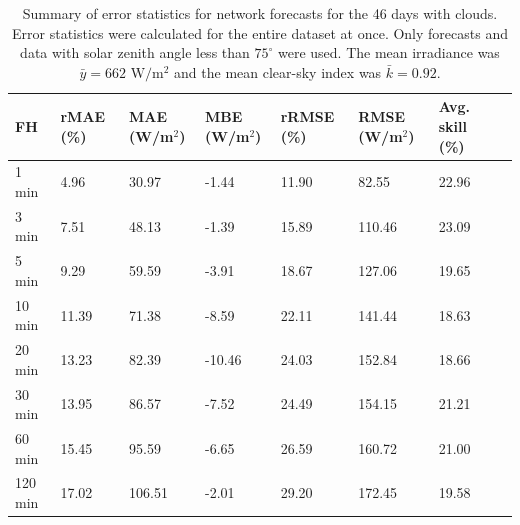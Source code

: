 \begin{table}
\centering
\caption[Error statistics for network forecasts]{
  Summary of error statistics for network forecasts for the 46
  days with clouds. Error statistics were calculated for the entire
  dataset at once. Only forecasts and data with solar zenith angle
  less than $75^\circ$ were used. The mean irradiance was $\bar{y} =
  662 \mbox{ W/m$^2$}$ and the mean clear-sky index was $\bar{k} =
  0.92$.
}
\begin{tabular}{llllllll}
\toprule
FH &  rMAE (\%) &  MAE (W/m$^2$) &  MBE (W/m$^2$) &  rRMSE (\%) &  RMSE (W/m$^2$) &  Avg. skill (\%) \\
\midrule
 1 min  &      4.96 &          30.97 &          -1.44 &      11.90 &           82.55 &           22.96 \\
 3 min  &      7.51 &          48.13 &          -1.39 &      15.89 &          110.46 &           23.09 \\
 5 min  &      9.29 &          59.59 &          -3.91 &      18.67 &          127.06 &           19.65 \\
10 min  &     11.39 &          71.38 &          -8.59 &      22.11 &          141.44 &           18.63 \\
20 min  &     13.23 &          82.39 &         -10.46 &      24.03 &          152.84 &           18.66 \\
30 min  &     13.95 &          86.57 &          -7.52 &      24.49 &          154.15 &           21.21 \\
60 min  &     15.45 &          95.59 &          -6.65 &      26.59 &          160.72 &           21.00 \\
120 min &     17.02 &         106.51 &          -2.01 &      29.20 &          172.45 &           19.58 \\
\bottomrule
\end{tabular}
\label{table:network_errors}
\end{table}

